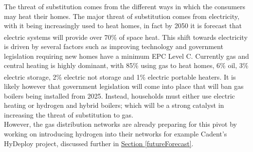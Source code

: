 \documentclass[11pt]{article}		%
\newcommand{\supercite}[1]{\textsuperscript{\cite{#1}}}		%
\newcommand{\sectref}[1]{\hyperref[#1]{Section \ref*{#1}}}     %
\begin{document}
                The threat of substitution comes from the different ways in which the consumers may heat their homes. The major threat of substitution comes from electricity, with it being increasingly used to heat homes, in fact by 2050 it is forecast that electric systems will provide over 70\% of space heat\supercite{heating_tech}. This shift towards electricity is driven by several factors such as improving technology and government legislation requiring new homes have a minimum EPC Level C. Currently gas and central heating is highly dominant, with 85\% using gas to heat homes, 6\% oil, 3\% electric storage, 2\% electric not storage and 1\% electric portable heaters\supercite{heating}. It is likely however that government legislation will come into place that will ban gas boilers being installed from 2025. Instead, households must either use electric heating or hydrogen and hybrid boilers; which will be a strong catalyst in increasing the threat of substitution to gas. 
                \\ 
                \hspace*{2ex}However, the gas distribution networks are already preparing for this pivot by working on introducing hydrogen into their networks for example Cadent’s HyDeploy project, discussed further in \sectref{futureForecast}. 
\end{document}
